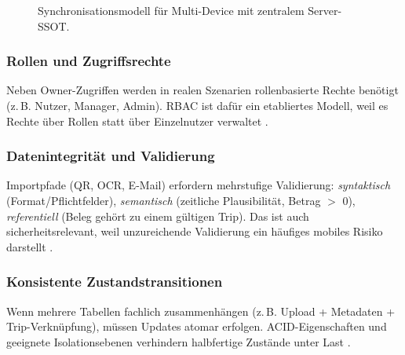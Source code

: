 \begin{figure}[H]
  \centering
  \caption{Synchronisationsmodell für Multi-Device mit zentralem Server-SSOT.}
  \label{fig:sync_model}
\end{figure}

\subsubsection{Rollen und Zugriffsrechte}
Neben Owner-Zugriffen werden in realen Szenarien rollenbasierte Rechte benötigt
(z.\,B. Nutzer, Manager, Admin). RBAC ist dafür ein etabliertes Modell, weil es
Rechte über Rollen statt über Einzelnutzer verwaltet \cite{rbacNist1996}.

\subsubsection{Datenintegrität und Validierung}
Importpfade (QR, OCR, E-Mail) erfordern mehrstufige Validierung:
\textit{syntaktisch} (Format/Pflichtfelder), \textit{semantisch}
(zeitliche Plausibilität, Betrag $>$ 0), \textit{referentiell}
(Beleg gehört zu einem gültigen Trip). Das ist auch sicherheitsrelevant, weil
unzureichende Validierung ein häufiges mobiles Risiko darstellt
\cite{owaspMobileTop10}.

\subsubsection{Konsistente Zustandstransitionen}
Wenn mehrere Tabellen fachlich zusammenhängen (z.\,B. Upload + Metadaten +
Trip-Verknüpfung), müssen Updates atomar erfolgen. ACID-Eigenschaften und
geeignete Isolationsebenen verhindern halbfertige Zustände unter Last
\cite{postgresqlTxIsolation}.

